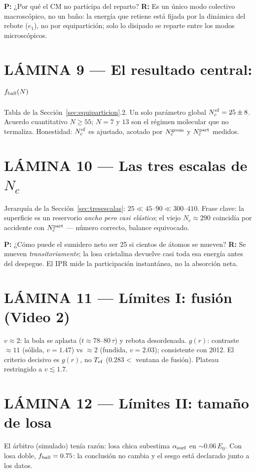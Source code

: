 \documentclass[11pt,a4paper]{article}
\begin{document}
\textbf{P:} ¿Por qué el CM no participa del reparto? \textbf{R:} Es un
único modo colectivo macroscópico, no un baño: la energía que retiene está
fijada por la dinámica del rebote ($e_1$), no por equipartición; solo lo
disipado se reparte entre los modos microscópicos.

\section*{LÁMINA 9 --- El resultado central: $f_{\rm ball}(N)$}
Tabla de la Sección~\ref{sec:equiparticion}.2. Un solo parámetro global
$N_c^{\rm ef}=25\pm8$. Acuerdo cuantitativo $N\ge55$; $N=7$ y $13$ son el
régimen molecular que no termaliza. Honestidad: $N_c^{\rm ef}$ es ajustado,
acotado por $N_c^{\rm geom}$ y $N_c^{\rm part}$ medidos.

\section*{LÁMINA 10 --- Las tres escalas de $N_c$}
Jerarquía de la Sección~\ref{sec:tresescalas}: $25 \ll 45$--$90 \ll
300$--$410$. Frase clave: la superficie es un reservorio \emph{ancho pero
casi elástico}; el viejo $N_c\approx290$ coincidía por accidente con
$N_c^{\rm part}$ --- número correcto, balance equivocado.

\textbf{P:} ¿Cómo puede el sumidero neto ser 25 si cientos de átomos se
mueven? \textbf{R:} Se mueven \emph{transitoriamente}; la losa cristalina
devuelve casi toda esa energía antes del despegue. El IPR mide la
participación instantánea, no la absorción neta.

\section*{LÁMINA 11 --- Límites I: fusión (Video 2)}
$v\approx2$: la bola se aplasta ($t\approx78$--$80\,\tau$) y rebota
desordenada. $g(r)$: contraste $\approx11$ (sólida, $v=1.47$) vs $\approx2$
(fundida, $v=2.03$); consistente con 2012. El criterio decisivo es $g(r)$,
no $T_{\rm ef}$ ($0.283 <$ ventana de fusión). Plateau restringido a
$v\lesssim1.7$.

\section*{LÁMINA 12 --- Límites II: tamaño de losa}
El árbitro (simulado) tenía razón: losa chica subestima $\alpha_{\rm surf}$
en $\sim0.06\,E_0$. Con losa doble, $f_{\rm ball} = 0.75$: la conclusión no
cambia y el sesgo está declarado junto a los datos.
\end{document}
